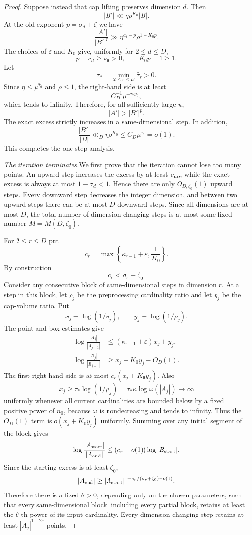 \documentclass[11pt,reqno]{amsart}
\theoremstyle{definition}
\theoremstyle{remark}
\newcommand{\eps}{\varepsilon}
\begin{document}
\begin{proof}
Suppose instead that cap lifting preserves dimension $d$.  Then
\[
 |B'|\ll\eta\rho^{K_0}|B|.
\]
At the old exponent $p=\sigma_d+\zeta$ we have
\[
 \frac{|A'|}{|B'|^p}
 \gg
 \eta^{a_d-p}\rho^{1-K_0p}.
\]
The choices of $\eps$ and $K_0$ give, uniformly for $2\le d\le D$,
\[
 p-a_d\ge\nu_0>0,
 \qquad
 K_0p-1\ge1.
\]
Let
\[
 \tau_* =\min_{2\le r\le D}\widehat\tau_r>0.
\]
Since $\eta\le\mu^{\widehat\tau_d}$ and $\rho\le1$, the right-hand side is at least
\[
 C_D^{-1}\mu^{-\tau_*\nu_0},
\]
which tends to infinity.  Therefore, for all sufficiently large $n$,
\[
 |A'|>|B'|^p.
\]
The exact excess strictly increases in a same-dimensional step.  In
addition,
\[
 \frac{|B'|}{|B|}
 \ll_D\eta\rho^{K_0}
 \le C_D\mu^{\tau_*}=o(1).
\]
This completes the one-step analysis.

\medskip\noindent\emph{The iteration terminates.}\quad We first prove
that the iteration cannot lose too many points.  An upward
step increases the excess by at least $c_{\rm up}$, while the exact excess
is always at most $1-\sigma_d<1$.  Hence there are only
$O_{D,\zeta_0}(1)$ upward steps.  Every downward step decreases the
integer dimension, and between two upward steps there can be at most $D$
downward steps.  Since all dimensions are at most $D$, the total number
of dimension-changing steps is at most some fixed number
$M=M(D,\zeta_0)$.

For $2\le r\le D$ put
\[
 c_r=\max\left\{\kappa_{r-1}+\eps,\frac1{K_0}\right\}.
\]
By construction
\[
 c_r<\sigma_r+\zeta_0.
\]
Consider any consecutive block of same-dimensional steps in dimension
$r$.  At a step in this block, let $\rho_j$ be the preprocessing
cardinality ratio and let $\eta_j$ be the cap-volume ratio.  Put
\[
 x_j=\log(1/\eta_j),
 \qquad
 y_j=\log(1/\rho_j).
\]
The point and box estimates give
\begin{align*}
 \log\frac{|A_j|}{|A_{j+1}|}
 &\le (\kappa_{r-1}+\eps)x_j+y_j,\\
 \log\frac{|B_j|}{|B_{j+1}|}
 &\ge x_j+K_0y_j-O_D(1).
\end{align*}
The first right-hand side is at most
$c_r(x_j+K_0y_j)$.  Also
\[
 x_j\ge\tau_*\log(1/\mu_j)
 =\tau_*\kappa\log\omega(|A_j|)\longrightarrow\infty
\]
uniformly whenever all current cardinalities are bounded below by a fixed
positive power of $n_0$, because $\omega$ is nondecreasing and tends to
infinity.  Thus the $O_D(1)$ term is
$o(x_j+K_0y_j)$ uniformly.  Summing over any initial segment of the block
gives
\[
 \log\frac{|A_{\rm start}|}{|A_{\rm end}|}
 \le(c_r+o(1))\log|B_{\rm start}|.
\]
Since the starting excess is at least $\zeta_0$,
\[
 |A_{\rm end}|
 \ge
 |A_{\rm start}|^{1-c_r/(\sigma_r+\zeta_0)-o(1)}.
\]
Therefore there is a fixed $\theta>0$, depending only on the chosen
parameters, such that every same-dimensional block, including every
partial block, retains at least the $\theta$-th power of its input
cardinality.  Every dimension-changing step retains at least
$|A_j|^{1-2\eps}$ points.


\end{proof}
\end{document}

